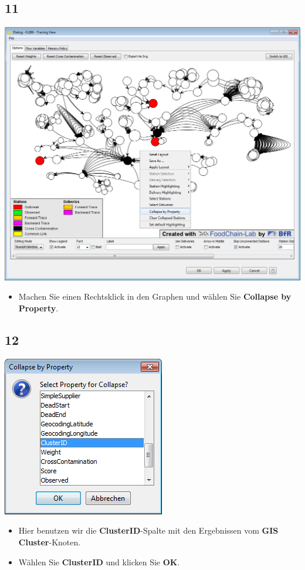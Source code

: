 \documentclass{beamer}
\begin{document}
\subsection{11}
\begin{frame}
	\begin{center}
  		\includegraphics[height=0.6\textheight]{11.png}
	\end{center}
	\begin{itemize}
		\item Machen Sie einen Rechtsklick in den Graphen und wählen Sie \textbf{Collapse by Property}.
	\end{itemize}
\end{frame}

\subsection{12}
\begin{frame}
	\begin{center}
  		\includegraphics[height=0.5\textheight]{12.png}
	\end{center}
	\begin{itemize}
		\item Hier benutzen wir die \textbf{ClusterID}-Spalte mit den Ergebnissen vom \textbf{GIS Cluster}-Knoten.
		\item Wählen Sie \textbf{ClusterID} und klicken Sie \textbf{OK}.
	\end{itemize}
\end{frame}
\end{document}
